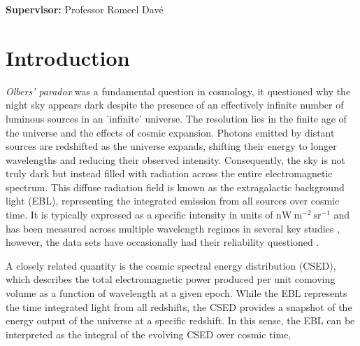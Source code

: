 \documentclass[
    a4paper, %
    10pt, %
    unnumberedsections, %
]{LTJournalArticle}
\begin{document}
\vspace*{4cm}

\vfill
\begin{center}
    {\bf Supervisor:} Professor Romeel Davé               
\end{center}
\newpage

\twocolumn
\setcounter{page}{1} %


\section{Introduction}


\textit{Olbers' paradox} was a fundamental question in cosmology, it questioned why the night sky appears dark despite the presence of an effectively infinite number of luminous sources in an 'infinite' universe. The resolution lies in the finite age of the universe and the effects of cosmic expansion. Photons emitted by distant sources are redshifted as the universe expands, shifting their energy to longer wavelengths and reducing their observed intensity. Consequently, the sky is not truly dark but instead filled with radiation across the entire electromagnetic spectrum. This diffuse radiation field is known as the extragalactic background light (EBL), representing the integrated emission from all sources over cosmic time. It is typically expressed as a specific intensity in units of $\mathrm{nW\ m^{-2}\ sr^{-1}}$ and has been measured across multiple wavelength regimes in several key studies \parencite{longairUniversalElectromagneticBackground1972,kashlinskyCosmicInfraredBackground2005,wessonOlberssParadoxSpectral1991,hauserCosmicInfraredBackground2001a,bernsteinOpticalExtragalacticBackground2007,vavrycukUniverseOpacityEBL2017}, however, the data sets have occasionally had their reliability questioned \parencite{mattila1mmDiscontinuityExtragalactic2006}.

A closely related quantity is the cosmic spectral energy distribution (CSED), which describes the total electromagnetic power produced per unit comoving volume as a function of wavelength at a given epoch. While the EBL represents the time integrated light from all redshifts, the CSED provides a snapshot of the energy output of the universe at a specific redshift. In this sense, the EBL can be interpreted as the integral of the evolving CSED over cosmic time,
\end{document}

